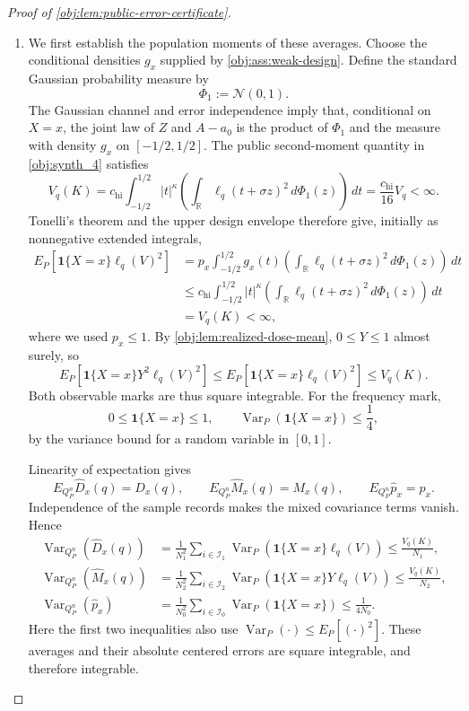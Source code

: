 \documentclass[11pt]{article}
\begin{document}
\begin{proof}[Proof of \cref{obj:lem:public-error-certificate}]
\begin{enumerate}
\item
We first establish the population moments of these averages. Choose the
conditional densities \(g_x\) supplied by \cref{obj:ass:weak-design}.
Define the standard Gaussian probability measure by
\[
\Phi_1:=\mathcal N(0,1).
\]
The Gaussian channel and error independence imply that, conditional on
\(X=x\), the joint law of \(Z\) and \(A-a_0\) is the product of
\(\Phi_1\) and the measure with density \(g_x\) on \([-1/2,1/2]\).
The public second-moment quantity in \cref{obj:synth_4} satisfies
\[
V_q(K)
=c_{\mathrm{hi}}\int_{-1/2}^{1/2}|t|^\kappa
       \left(\int_{\mathbb R}\ell_q(t+\sigma z)^2\,d\Phi_1(z)\right)\,dt
=\frac{c_{\mathrm{hi}}}{16}V_q<\infty.
\]
Tonelli's theorem and the upper design envelope therefore give, initially
as nonnegative extended integrals,
\[
\begin{aligned}
E_P[\mathbf1\{X=x\}\ell_q(V)^2]
&=p_x\int_{-1/2}^{1/2}g_x(t)
       \left(\int_{\mathbb R}\ell_q(t+\sigma z)^2\,d\Phi_1(z)\right)\,dt\\
&\le c_{\mathrm{hi}}\int_{-1/2}^{1/2}|t|^\kappa
       \left(\int_{\mathbb R}\ell_q(t+\sigma z)^2\,d\Phi_1(z)\right)\,dt\\
&=V_q(K)<\infty,
\end{aligned}
\]
where we used \(p_x\le1\).
By \cref{obj:lem:realized-dose-mean}, \(0\le Y\le1\) almost surely, so
\[
E_P[\mathbf1\{X=x\}Y^2\ell_q(V)^2]
\le E_P[\mathbf1\{X=x\}\ell_q(V)^2]
\le V_q(K).
\]
Both observable marks are thus square integrable. For the frequency mark,
\[
0\le\mathbf1\{X=x\}\le1,
\qquad
\operatorname{Var}_P(\mathbf1\{X=x\})\le\frac14,
\]
by the variance bound for a random variable in \([0,1]\).

Linearity of expectation gives
\[
E_{Q_P^n}\widehat D_x(q)=D_x(q),\qquad
E_{Q_P^n}\widehat M_x(q)=M_x(q),\qquad
E_{Q_P^n}\widehat p_x=p_x.
\]
Independence of the sample records makes the mixed covariance terms vanish.
Hence
\[
\begin{aligned}
\operatorname{Var}_{Q_P^n}(\widehat D_x(q))
&=\frac1{N_1^2}\sum_{i\in\mathcal I_1}
  \operatorname{Var}_P(\mathbf1\{X=x\}\ell_q(V))
\le\frac{V_q(K)}{N_1},\\
\operatorname{Var}_{Q_P^n}(\widehat M_x(q))
&=\frac1{N_2^2}\sum_{i\in\mathcal I_2}
  \operatorname{Var}_P(\mathbf1\{X=x\}Y\ell_q(V))
\le\frac{V_q(K)}{N_2},\\
\operatorname{Var}_{Q_P^n}(\widehat p_x)
&=\frac1{N_0^2}\sum_{i\in\mathcal I_0}
  \operatorname{Var}_P(\mathbf1\{X=x\})
\le\frac1{4N_0}.
\end{aligned}
\]
Here the first two inequalities also use
\(\operatorname{Var}_P(\cdot)\le E_P[(\cdot)^2]\).
These averages and their absolute centered errors are square integrable,
and therefore integrable.


\end{enumerate}
\end{proof}
\end{document}
